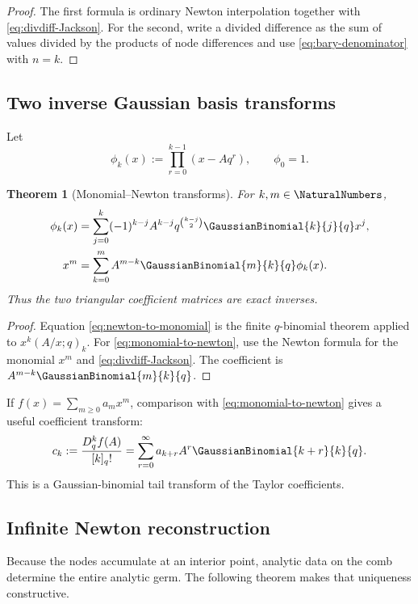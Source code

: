 \documentclass[11pt,oneside]{article}
\numberwithin{equation}{section}
\newtheorem{theorem}{Theorem}[section]
\theoremstyle{definition}
\theoremstyle{remark}
\begin{document}
\begin{proof}
The first formula is ordinary Newton interpolation together with
\eqref{eq:divdiff-Jackson}.  For the second, write a divided difference as the
sum of values divided by the products of node differences and use
\eqref{eq:bary-denominator} with $n=k$.
\end{proof}

\subsection{Two inverse Gaussian basis transforms}

Let
\[
 \phi_k(x):=\prod_{r=0}^{k-1}(x-Aq^r),\qquad \phi_0=1.
\]

\begin{theorem}[Monomial--Newton transforms]
For $k,m\in\NaturalNumbers$,
\begin{align}
 \phi_k(x)
 &=\sum_{j=0}^k(-1)^{k-j}A^{k-j}q^{\binom{k-j}{2}}
   \GaussianBinomial{k}{j}{q}x^j,
 \label{eq:newton-to-monomial}\\
 x^m
 &=\sum_{k=0}^mA^{m-k}\GaussianBinomial{m}{k}{q}\phi_k(x).
 \label{eq:monomial-to-newton}
\end{align}
Thus the two triangular coefficient matrices are exact inverses.
\end{theorem}

\begin{proof}
Equation \eqref{eq:newton-to-monomial} is the finite $q$-binomial theorem
applied to $x^k(A/x;q)_k$.  For \eqref{eq:monomial-to-newton}, use the Newton
formula for the monomial $x^m$ and
\eqref{eq:divdiff-Jackson}.  The coefficient is
$A^{m-k}\GaussianBinomial{m}{k}{q}$.
\end{proof}

If $f(x)=\sum_{m\ge0}a_mx^m$, comparison with
\eqref{eq:monomial-to-newton} gives a useful coefficient transform:
\begin{equation}
 c_k:=\frac{D_q^kf(A)}{[k]_q!}
 =\sum_{r=0}^{\infty}a_{k+r}A^r\GaussianBinomial{k+r}{k}{q}.
 \label{eq:analytic-Newton-coeff}
\end{equation}
This is a Gaussian-binomial tail transform of the Taylor coefficients.

\subsection{Infinite Newton reconstruction}

Because the nodes accumulate at an interior point, analytic data on the comb
determine the entire analytic germ.  The following theorem makes that
uniqueness constructive.
\end{document}
